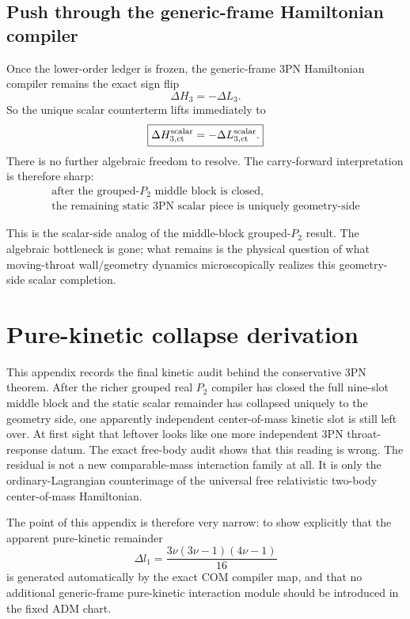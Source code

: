 \documentclass[11pt]{article}
\begin{document}
\subsection{Push through the generic-frame Hamiltonian compiler}
\label{app:static_p0_geometry_counterterm_sigma_collapse:hamiltonian_image}

Once the lower-order ledger is frozen, the generic-frame $3$PN Hamiltonian compiler remains the exact sign flip
\[
\Delta H_3=-\Delta L_3.
\]
So the unique scalar counterterm lifts immediately to
\[
\boxed{
\Delta H_{3,\rm ct}^{\rm scalar}=-\Delta L_{3,\rm ct}^{\rm scalar}.
}
\]
There is no further algebraic freedom to resolve. The carry-forward interpretation is therefore sharp:
\[
 \boxed{\begin{gathered}
 \text{after the grouped-}P_2\text{ middle block is closed,}\\
 \text{the remaining static }3\text{PN scalar piece is uniquely geometry-side}
 \end{gathered}}
\]

This is the scalar-side analog of the middle-block grouped-$P_2$ result. The algebraic bottleneck is gone; what remains is the physical question of what moving-throat wall/geometry dynamics microscopically realizes this geometry-side scalar completion.

\section{Pure-kinetic collapse derivation}
\label{app:pure_kinetic_collapse_derivation}

This appendix records the final kinetic audit behind the conservative $3$PN theorem. After the richer grouped real $P_2$ compiler has closed the full nine-slot middle block and the static scalar remainder has collapsed uniquely to the geometry side, one apparently independent center-of-mass kinetic slot is still left over. At first sight that leftover looks like one more independent $3$PN throat-response datum. The exact free-body audit shows that this reading is wrong. The residual is not a new comparable-mass interaction family at all. It is only the ordinary-Lagrangian counterimage of the universal free relativistic two-body center-of-mass Hamiltonian.

The point of this appendix is therefore very narrow: to show explicitly that the apparent pure-kinetic remainder
\[
\Delta l_1=\frac{3\nu(3\nu-1)(4\nu-1)}{16}
\]
is generated automatically by the exact COM compiler map, and that no additional generic-frame pure-kinetic interaction module should be introduced in the fixed ADM chart.
\end{document}
